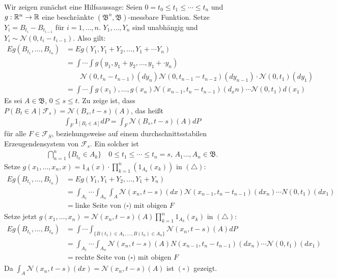 \documentclass[a4paper,twoside,DIV15,BCOR12mm]{scrbook}
\newcommand{\cF}{\mathcal F}
\newcommand{\borel}{{\mathfrak B}}
\begin{document}
\begin{beweis}
Wir zeigen zunächst eine Hilfsaussage: Seien $0=t_0\le t_1\le \cdots \le t_n$ und $g:\mathbb{R}^n\to \mathbb{R}$ eine beschränkte $(\borel^n,\borel)$-messbare Funktion. Setze $Y_i=B_{t_i}-B_{t_{i-1}}$ für $i=1,\ldots,n$. $Y_1,\ldots,Y_n$ sind unabhängig und $Y_i\sim\mathcal N(0,t_i-t_{i-1})$. Also gilt:
\begin{align*}
Eg(B_{t_1},\ldots,B_{t_n}) &= Eg(Y_1,Y_1+Y_2,\ldots,Y_1+\cdots Y_n) \tag{$\triangle$}\\
&= 
\int\cdots\int g(y_1,y_1+y_2,\ldots,y_1+\cdot y_n) \\
&\quad\quad 
\mathcal N(0,t_n-t_{n-1})(dy_n) \mathcal N(0,t_{n-1}-t_{n-2})(dy_{n-1})\cdot \mathcal N(0,t_1)(dy_1)\\
&= \int\cdots\int g(x_1),\ldots,g(x_n) \mathcal N(x_{n-1},t_n-t_{n-1})(d_xn) \cdots \mathcal N(0,t_1)d(x_1)
\end{align*}
Es sei $A\in \borel$, $0\le s\le t$. Zu zeige ist, dass $P(B_t\in A\mid \cF_s) = \mathcal N(B_s,t-s)(A)$, das heißt
\begin{align*}
\int_F 1_{[B_t\in A]} dP = \int_F\mathcal N(B_s,t-s)(A)dP \tag{$\square$}
\end{align*}
für alle $F\in \cF_S$, beziehungsweise auf einem durchschnittsstabilen Erzeugendensystem von $\cF_s$. Ein solcher ist
\begin{align*}
\bigcap_{n=1}^n \{B_{t_k}\in A_k\}\quad 0\le t_1\le \cdots\le t_n=s,\, A_1\ldots,A_n\in \borel.
\end{align*}
Setze $g(x_1,\ldots,x_n,x)= 1_A(x)\cdot \prod_{k=1}^n(1_{A_k}(x_k))$ in $(\triangle)$:
\begin{align*}
Eg(B_{t_1},\ldots,B_{t_n}) &= Eg(Y_1,Y_1+Y_2,\ldots,Y_1+Y_n) \\
&=\int_{A_1}\cdots\int_{A_n}\int_A \mathcal N(x_n,t-s)(dx)\mathcal N(x_{n-1},t_n-t_{n-1})(dx_n)\cdots N(0,t_1)(dx_1) \\
&= \text{linke Seite von ($\square$) mit obigen $F$}
\end{align*}
Setze jetzt $g(x_1,\ldots,x_n) = \mathcal N(x_n,t-s)(A)\prod_{k=1}^n 1_{A_k}(x_k)$ in $(\triangle)$:
\begin{align*}
Eg(B_{t_1},\ldots,B_{t_n}) &= \int\cdots\int_{\{B(t_1)\in A_1,\ldots,B(t_n)\in A_n\}} \mathcal N(x_n,t-s)(A) dP\\
&= \int_{A_1}\cdots\int_{A_n} \mathcal N (x_n,t-s)(A) N(x_{n-1},t_n-t_{n-1})(dx_n) \cdots \mathcal N(0,t_1)(dx_1)\\
&= \text{rechte Seite von ($\square$) mit obigen $F$}
\end{align*}
Da $\int_A\mathcal N(x_n,t-s)(dx) = \mathcal N(x_n,t-s)(A)$ ist $(\square)$ gezeigt.
\end{beweis}
\end{document}
